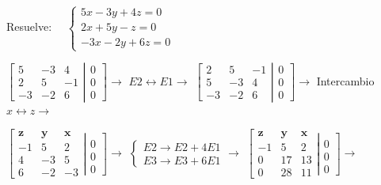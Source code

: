 \begin{ejre} 
Resuelve: $\quad \begin{cases} 5x-3y+4z=0\\2x+5y-z=0\\-3x-2y+6z=0   \end{cases}$ 
\end{ejre}
\begin{proofw}\renewcommand{\qedsymbol}{$\diamond$}
\small{$\left[ \begin{matrix}
  5 & -3 & 4 \\ 2 & 5 & -1 \\ -3 & -2 & 6 
 \end{matrix}\right. 
 \left| \begin{matrix}
  0 \\ 0 \\ 0 
 \end{matrix}\right] \to $}
\small{\textcolor{gris}{$E2\leftrightarrow E1 \to $}}
 $\left[ \begin{matrix}
   2 & 5 & -1  \\ 5 & -3 & 4 \\ -3 & -2 & 6 
 \end{matrix}\right. 
 \left| \begin{matrix}
  0 \\ 0 \\ 0 
 \end{matrix}\right]  \to $
 \footnotesize{\textcolor{gris}{Intercambio $x\leftrightarrow z \to$}}
 
\normalsize{ \noindent  $\left[ \begin{matrix}
  \boldsymbol{z} & \boldsymbol{y} & \boldsymbol{x} \\
   -1 & 5 & 2  \\ 4 & -3 & 5 \\ 6 & -2 & -3 
 \end{matrix}\right. 
 \left| \begin{matrix}
 \\ 0 \\ 0 \\ 0 
 \end{matrix}\right]  \to $
 \textcolor{gris}{$\begin{cases} E2\to E2+4E1 \\ E3 \to E3+6E1 \end{cases} \to $}
  $\left[ \begin{matrix}
  \boldsymbol{z} & \boldsymbol{y} & \boldsymbol{x} \\
   -1 & 5 & 2  \\ 0 & 17 & 13 \\ 0 & 28 & 11 
 \end{matrix}\right. 
 \left| \begin{matrix}
 \\ 0 \\ 0 \\ 0 
 \end{matrix}\right]  \to $}
 

\end{proofw}
